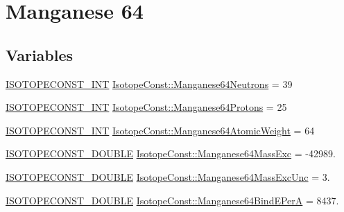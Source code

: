 \hypertarget{group___isotope_const-_manganese-_mn64}{}\section{Manganese 64}
\label{group___isotope_const-_manganese-_mn64}
\subsection*{Variables}
\begin{DoxyCompactItemize}
\item 
\mbox{\hyperlink{group___isotope_const-_macros_ga5f18360b3e99483a35c32d789e62621c}{I\+S\+O\+T\+O\+P\+E\+C\+O\+N\+S\+T\+\_\+\+I\+NT}} \mbox{\hyperlink{group___isotope_const-_manganese-_mn64_ga217d96ec23f0365a587da475e91367e4}{Isotope\+Const\+::\+Manganese64\+Neutrons}} = 39
\item 
\mbox{\hyperlink{group___isotope_const-_macros_ga5f18360b3e99483a35c32d789e62621c}{I\+S\+O\+T\+O\+P\+E\+C\+O\+N\+S\+T\+\_\+\+I\+NT}} \mbox{\hyperlink{group___isotope_const-_manganese-_mn64_ga5d32a637294ab21573f18c855b512b7b}{Isotope\+Const\+::\+Manganese64\+Protons}} = 25
\item 
\mbox{\hyperlink{group___isotope_const-_macros_ga5f18360b3e99483a35c32d789e62621c}{I\+S\+O\+T\+O\+P\+E\+C\+O\+N\+S\+T\+\_\+\+I\+NT}} \mbox{\hyperlink{group___isotope_const-_manganese-_mn64_gae5c5cab6cc78b5db87fa18a9269221c3}{Isotope\+Const\+::\+Manganese64\+Atomic\+Weight}} = 64
\item 
\mbox{\hyperlink{group___isotope_const-_macros_ga8f45a7272ce02c0b4c65c44636ed719a}{I\+S\+O\+T\+O\+P\+E\+C\+O\+N\+S\+T\+\_\+\+D\+O\+U\+B\+LE}} \mbox{\hyperlink{group___isotope_const-_manganese-_mn64_ga0b0d2cc874241dd2aa7dce0081704805}{Isotope\+Const\+::\+Manganese64\+Mass\+Exc}} = -\/42989.
\item 
\mbox{\hyperlink{group___isotope_const-_macros_ga8f45a7272ce02c0b4c65c44636ed719a}{I\+S\+O\+T\+O\+P\+E\+C\+O\+N\+S\+T\+\_\+\+D\+O\+U\+B\+LE}} \mbox{\hyperlink{group___isotope_const-_manganese-_mn64_gac96b3c13890dbd5dafa15fdbfd0d3296}{Isotope\+Const\+::\+Manganese64\+Mass\+Exc\+Unc}} = 3.
\item 
\mbox{\hyperlink{group___isotope_const-_macros_ga8f45a7272ce02c0b4c65c44636ed719a}{I\+S\+O\+T\+O\+P\+E\+C\+O\+N\+S\+T\+\_\+\+D\+O\+U\+B\+LE}} \mbox{\hyperlink{group___isotope_const-_manganese-_mn64_ga8246b1058387895472a72faafee81989}{Isotope\+Const\+::\+Manganese64\+Bind\+E\+PerA}} = 8437.
\item 

\end{DoxyCompactItemize}
